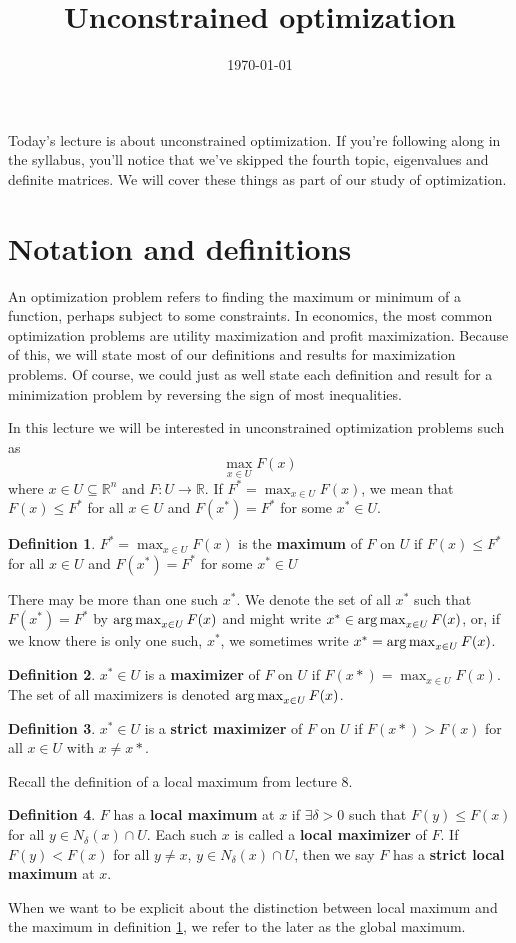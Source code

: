 \documentclass[12pt,reqno]{amsart}
\title{Unconstrained optimization}
\date{\today}
\theoremstyle{definition}
\newtheorem{definition}{Definition}[section]
\newcommand{\argmax}{\operatornamewithlimits{arg\,max}}
\def\R{\mathbb{R}}
\renewcommand{\to}{{\rightarrow}}
\begin{document}
\maketitle

Today's lecture is about unconstrained optimization. If you're
following along in the syllabus, you'll notice that we've skipped the
fourth topic, eigenvalues and definite matrices. We will cover these
things as part of our study of optimization. 

\section{Notation and definitions}
An optimization problem refers to finding the maximum or minimum of a
function, perhaps subject to some constraints. In economics, the most
common optimization problems are utility maximization and profit
maximization. Because of this, we will state most of our definitions
and results for maximization problems. Of course, we could just as
well state each definition and result for a minimization problem by
reversing the sign of most inequalities.

In this lecture we will be interested in unconstrained optimization
problems such as
\[ \max_{x\in U} F(x) \]
where $x \in U \subseteq \R^n$ and $F: U \to \R$. If $F^* =
\max_{x\in U} F(x)$, we
mean that $F(x) \leq F^*$ for all $x \in U$ and $F(x^*) = F^*$ for
some $x^* \in U$. 
\begin{definition}\label{d:max}
  $F^* = \max_{x \in U} F(x)$ is the \textbf{maximum} of $F$ on $U$ if
  $F(x) \leq F^*$ for all $x \in U$ and $F(x^*) = F^*$ for some $x^*
  \in U$
\end{definition}
There may be more than one such $x^*$. We denote
the set of all $x^*$ such that $F(x^*) = F^*$ by $\argmax_{x \in U} F(x)$ and
might write $x^* \in \argmax_{x \in U} F(x)$, or, if we know there is only one
such, $x^*$, we sometimes write $x^* = \argmax_{x \in U} F(x)$.
\begin{definition} \label{d:maxer}
  $x^* \in U$ is a \textbf{maximizer} of $F$ on $U$ if $F(x*)
  = \max_{x \in U} 
  F(x)$. The set of all maximizers is denoted $\argmax_{x \in U}
  F(x)$.
\end{definition}
\begin{definition}\label{d:smaxer}
  $x^* \in U$ is a \textbf{strict maximizer} of $F$ on $U$ if $F(x*) > F(x)
  $ for all $x \in U$ with $x \neq x*$. 
\end{definition}
Recall the definition of a local maximum from lecture 8.
\begin{definition}\label{d:lmax}
  $F$ has a \textbf{local maximum} at $x$ if $\exists \delta > 0$ such
  that $F(y) \leq F(x)$ for all $y \in  N_\delta(x) \cap U$. Each such
  $x$ is called a \textbf{local maximizer} of $F$. If $F(y) < F(x)$
  for all $y \neq x$, $y \in N_\delta(x) \cap U$, then we say $F$ has
  a \textbf{strict local maximum} at $x$.
\end{definition}
When we want to be explicit about the distinction between local
maximum and the maximum in definition \ref{d:max}, we refer to the
later as the global maximum.  
\end{document}
